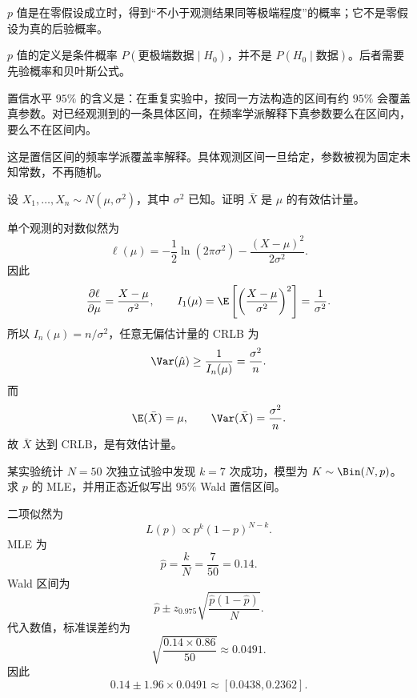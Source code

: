 
\begin{question}[判断题]
$p$ 值是在零假设成立时，得到“不小于观测结果同等极端程度”的概率；它不是零假设为真的后验概率。
\begin{solution}
$p$ 值的定义是条件概率 $P(\text{更极端数据}\mid H_0)$，并不是 $P(H_0\mid\text{数据})$。后者需要先验概率和贝叶斯公式。
\end{solution}
\end{question}

\begin{question}[判断题]
置信水平 $95\%$ 的含义是：在重复实验中，按同一方法构造的区间有约 $95\%$ 会覆盖真参数。对已经观测到的一条具体区间，在频率学派解释下真参数要么在区间内，要么不在区间内。
\begin{solution}
这是置信区间的频率学派覆盖率解释。具体观测区间一旦给定，参数被视为固定未知常数，不再随机。
\end{solution}
\end{question}

\begin{question}
设 $X_1,\ldots,X_n\sim N(\mu,\sigma^2)$，其中 $\sigma^2$ 已知。证明 $\bar X$ 是 $\mu$ 的有效估计量。
\begin{solution}
单个观测的对数似然为
\[
\ell(\mu)=-\frac12\ln(2\pi\sigma^2)-\frac{(X-\mu)^2}{2\sigma^2}.
\]
因此
\[
\frac{\partial\ell}{\partial\mu}=\frac{X-\mu}{\sigma^2},
\qquad
I_1(\mu)=\E\left[\left(\frac{X-\mu}{\sigma^2}\right)^2\right]=\frac1{\sigma^2}.
\]
所以 $I_n(\mu)=n/\sigma^2$，任意无偏估计量的 CRLB 为
\[
\Var(\hat\mu)\ge \frac1{I_n(\mu)}=\frac{\sigma^2}{n}.
\]
而
\[
\E(\bar X)=\mu,
\qquad
\Var(\bar X)=\frac{\sigma^2}{n}.
\]
故 $\bar X$ 达到 CRLB，是有效估计量。
\end{solution}
\end{question}

\begin{question}
某实验统计 $N=50$ 次独立试验中发现 $k=7$ 次成功，模型为 $K\sim\Bin(N,p)$。求 $p$ 的 MLE，并用正态近似写出 $95\%$ Wald 置信区间。
\begin{solution}
二项似然为
\[
L(p)\propto p^k(1-p)^{N-k}.
\]
MLE 为
\[
\hat p=\frac kN=\frac7{50}=0.14.
\]
Wald 区间为
\[
\hat p\pm z_{0.975}\sqrt{\frac{\hat p(1-\hat p)}{N}}.
\]
代入数值，标准误差约为
\[
\sqrt{\frac{0.14\times0.86}{50}}\approx0.0491.
\]
因此
\[
0.14\pm1.96\times0.0491\approx[0.0438,0.2362].
\]
\end{solution}
\end{question}

